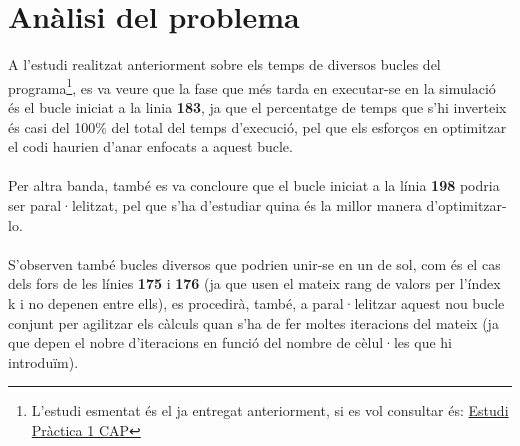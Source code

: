\documentclass[a4paper, 11pt]{article}
\begin{document}
\section{Anàlisi del problema}
A l'estudi realitzat anteriorment sobre els temps de diversos bucles del programa\footnote{L'estudi esmentat és el ja entregat anteriorment, si es vol consultar és: \textcolor{blue}{\href{https://drive.google.com/file/d/1cSu44VuoF-0nm9SR1Bhz5VClLV0hwk4E/view?usp=sharing}{Estudi Pràctica 1 CAP}}}, es va veure que la fase que més tarda en executar-se en la simulació és el bucle iniciat a la linia \textbf{183}, ja que el percentatge de temps que s'hi inverteix és casi del 100\% del total del temps d'execució, pel que els esforços en optimitzar el codi haurien d'anar enfocats a aquest bucle.\\\\
Per altra banda, també es va concloure que el bucle iniciat a la línia \textbf{198} podria ser paral·lelitzat, pel que s'ha d'estudiar quina és la millor manera d'optimitzar-lo.\\\\
S'observen també bucles diversos que podrien unir-se en un de sol, com és el cas dels fors de les línies \textbf{175} i \textbf{176} (ja que usen el mateix rang de valors per l'índex k i no depenen entre ells), es procedirà, també, a paral·lelitzar aquest nou bucle conjunt per agilitzar els càlculs quan s'ha de fer moltes iteracions del mateix (ja que depen el nobre d'iteracions en funció del nombre de cèlul·les que hi introduïm).\\
\end{document}
